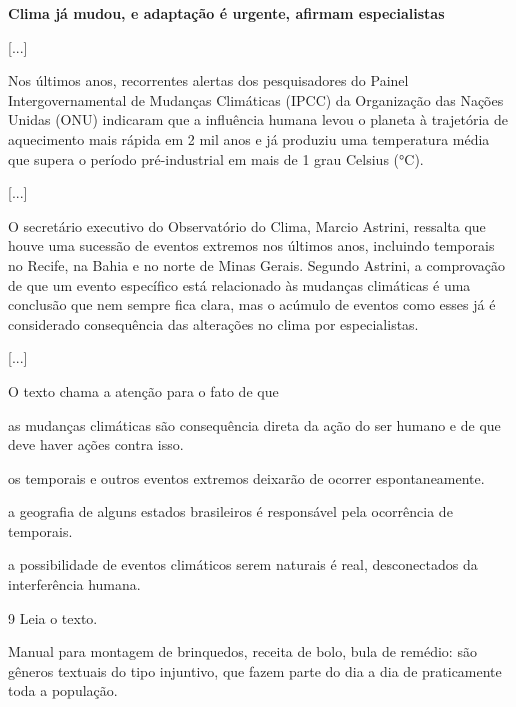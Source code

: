 \begin{myquote}
\textbf{Clima já mudou, e adaptação é urgente, afirmam especialistas}

{[}...{]}

Nos últimos anos, recorrentes alertas dos pesquisadores do Painel
Intergovernamental de Mudanças Climáticas (IPCC) da Organização das
Nações Unidas (ONU) indicaram que a influência humana levou o planeta à
trajetória de aquecimento mais rápida em 2 mil anos e já produziu uma
temperatura média que supera o período pré-industrial em mais de 1 grau
Celsius (°C).

{[}...{]}

O secretário executivo do Observatório do Clima, Marcio Astrini,
ressalta que houve uma sucessão de eventos extremos nos últimos anos,
incluindo temporais no Recife, na Bahia e no norte de Minas Gerais.
Segundo Astrini, a comprovação de que um evento específico está
relacionado às mudanças climáticas é uma conclusão que nem sempre fica
clara, mas o acúmulo de eventos como esses já é considerado consequência
das alterações no clima por especialistas.

{[}...{]}

\end{myquote}

O texto chama a atenção para o fato de que

\begin{escolha}
\item as mudanças climáticas são consequência direta da ação do ser humano e de que deve haver ações contra isso.

\item os temporais e outros eventos extremos deixarão de ocorrer espontaneamente.

\item a geografia de alguns estados brasileiros é responsável pela ocorrência de temporais.

\item a possibilidade de eventos climáticos serem naturais é real, desconectados da interferência humana.
\end{escolha}

\pagebreak
\num{9} Leia o texto.

\begin{myquote}
Manual para montagem de brinquedos, receita de bolo, bula de remédio:
são gêneros textuais do tipo injuntivo, que fazem parte do dia a dia de
praticamente toda a população.
\end{myquote}

